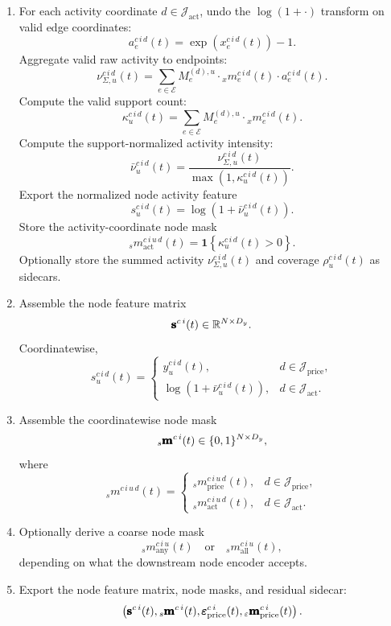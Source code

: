 \begin{enumerate}
	  \item For each activity coordinate
	  $d\in\mathcal{J}_{\mathrm{act}}$, undo the $\log(1+\cdot)$ transform on valid
	  edge coordinates:
  \[
    a_{e}^{c\,i\,d}(t)
    =
    \exp
    \left(
      x_{e}^{c\,i\,d}(t)
    \right)
	    -
	    1.
	  \]
	  Aggregate valid raw activity to endpoints:
	  \[
	    \nu_{\Sigma,u}^{c\,i\,d}(t)
	    =
	    \sum_{e\in\mathcal{E}}
	    M_{e}^{(d),u}
	    \cdot
	    {}_{x}m_{e}^{c\,i\,d}(t)
	    \cdot
	    a_{e}^{c\,i\,d}(t).
	  \]
	  Compute the valid support count:
	  \[
	    \kappa_{u}^{c\,i\,d}(t)
	    =
	    \sum_{e\in\mathcal{E}}
	    M_{e}^{(d),u}
	    \cdot
	    {}_{x}m_{e}^{c\,i\,d}(t).
	  \]
	  Compute the support-normalized activity intensity:
	  \[
	    \bar{\nu}_{u}^{c\,i\,d}(t)
	    =
	    \frac{
	      \nu_{\Sigma,u}^{c\,i\,d}(t)
	    }{
	      \max
	      \left(
	        1,
	        \kappa_{u}^{c\,i\,d}(t)
	      \right)
	    }.
	  \]
	  Export the normalized node activity feature
	  \[
	    s_u^{c\,i\,d}(t)
	    =
	    \log
	    \left(
	      1+\bar{\nu}_{u}^{c\,i\,d}(t)
	    \right).
	  \]
	  Store the activity-coordinate node mask
	  \[
	    {}_{s}m_{\mathrm{act}}^{c\,i\,u\,d}(t)
    =
    \mathbf{1}
	    \left\{
	      \kappa_{u}^{c\,i\,d}(t)>0
	    \right\}.
	  \]
	  Optionally store the summed activity
	  $\nu_{\Sigma,u}^{c\,i\,d}(t)$ and coverage
	  $\rho_u^{c\,i\,d}(t)$ as sidecars.

  \item Assemble the node feature matrix
  \[
    \pmb{\mathbf{s}}^{c\,i}(t)
    \in
    \mathbb{R}^{N\times D_y}.
  \]
  Coordinatewise,
  \[
    s_u^{c\,i\,d}(t)
    =
    \begin{cases}
      \widehat{y}_{u}^{c\,i\,d}(t),
      & d\in\mathcal{J}_{\mathrm{price}},\\[0.8em]
	      \log
	      \left(
	        1+\bar{\nu}_{u}^{c\,i\,d}(t)
	      \right),
      & d\in\mathcal{J}_{\mathrm{act}}.
    \end{cases}
  \]

  \item Assemble the coordinatewise node mask
  \[
    {}_{s}\pmb{\mathbf{m}}^{c\,i}(t)
    \in
    \{0,1\}^{N\times D_y},
  \]
  where
  \[
    {}_{s}m^{c\,i\,u\,d}(t)
    =
    \begin{cases}
      {}_{s}m_{\mathrm{price}}^{c\,i\,u\,d}(t),
      & d\in\mathcal{J}_{\mathrm{price}},\\[0.6em]
      {}_{s}m_{\mathrm{act}}^{c\,i\,u\,d}(t),
      & d\in\mathcal{J}_{\mathrm{act}}.
    \end{cases}
  \]

  \item Optionally derive a coarse node mask
  \[
    {}_{s}m_{\mathrm{any}}^{c\,i\,u}(t)
    \quad\text{or}\quad
    {}_{s}m_{\mathrm{all}}^{c\,i\,u}(t),
  \]
  depending on what the downstream node encoder accepts.

  \item Export the node feature matrix, node masks, and residual sidecar:
  \[
    \left(
      \pmb{\mathbf{s}}^{c\,i}(t),
      {}_{s}\pmb{\mathbf{m}}^{c\,i}(t),
      \pmb{\mathbf{\varepsilon}}_{\mathrm{price}}^{c\,i}(t),
      {}_{\varepsilon}\pmb{\mathbf{m}}_{\mathrm{price}}^{c\,i}(t)
    \right).
  \]
\end{enumerate}

